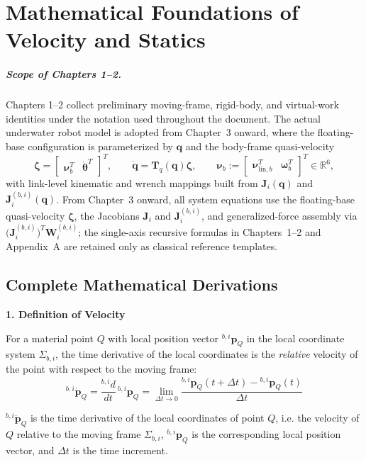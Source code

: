 \documentclass[12pt,a4paper]{report}
\newcommand{\newsymbols}[1]{\par\noindent{}#1\par\vspace{0.35em}}
\newcommand{\vect}[1]{\mathbf{#1}}
\newcommand{\Frame}[1]{\Sigma_{#1}}
\begin{document}
\chapter{Mathematical Foundations of Velocity and Statics}
\renewcommand{\theequation}{\thechapter.\arabic{equation}}
\setcounter{equation}{0}

\paragraph{Scope of Chapters 1--2.}
Chapters 1--2 collect preliminary moving-frame, rigid-body, and virtual-work identities under the notation used throughout the document. The actual underwater robot model is adopted from Chapter~3 onward, where the floating-base configuration is parameterized by $\mathbf{q}$ and the body-frame quasi-velocity
\begin{equation}
\boldsymbol{\zeta}
=
\begin{bmatrix}
\boldsymbol{\nu}_{b}^{T} & \dot{\boldsymbol{\theta}}^{T}
\end{bmatrix}^{T},
\qquad
\dot{\mathbf{q}} = \mathbf{T}_{q}(\mathbf{q})\boldsymbol{\zeta},
\qquad
\boldsymbol{\nu}_b :=
\begin{bmatrix}
\boldsymbol{\nu}_{\mathrm{lin},b}^{T} & \boldsymbol{\omega}_{b}^{T}
\end{bmatrix}^{T}
\in \mathbb{R}^{6},
\end{equation}
with link-level kinematic and wrench mappings built from $\mathbf{J}_i(\mathbf{q})$ and $\mathbf{J}_i^{(b,i)}(\mathbf{q})$.
From Chapter~3 onward, all system equations use the floating-base quasi-velocity $\boldsymbol{\zeta}$, the Jacobians $\mathbf{J}_i$ and $\mathbf{J}_i^{(b,i)}$, and generalized-force assembly via $\bigl(\mathbf{J}_i^{(b,i)}\bigr)^T\mathbf{W}_i^{(b,i)}$; the single-axis recursive formulas in Chapters~1--2 and Appendix~A are retained only as classical reference templates.

\section*{Complete Mathematical Derivations}

\textbf{1. Definition of Velocity}

For a material point $Q$ with local position vector ${}^{b,i}\vect{p}_{Q}$ in the local coordinate system $\Frame{b,i}$, the time derivative of the local coordinates is the \emph{relative} velocity of the point with respect to the moving frame:
\begin{equation}
{}^{b,i}\dot{\vect{p}}_{Q}
=
\frac{{}^{b,i}d}{dt}\,{}^{b,i}\vect{p}_{Q}
=
\lim_{\Delta t \to 0}
\frac{{}^{b,i}\vect{p}_{Q}(t+\Delta t) - {}^{b,i}\vect{p}_{Q}(t)}{\Delta t}
\end{equation}
\newsymbols{${}^{b,i}\dot{\vect{p}}_{Q}$ is the time derivative of the local coordinates of point $Q$, i.e. the velocity of $Q$ relative to the moving frame $\Frame{b,i}$, ${}^{b,i}\vect{p}_{Q}$ is the corresponding local position vector, and $\Delta t$ is the time increment.}
\end{document}
